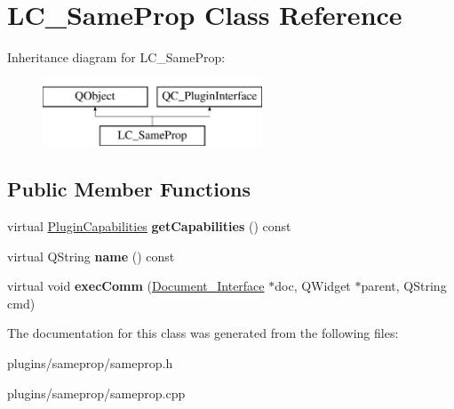 \hypertarget{classLC__SameProp}{\section{L\-C\-\_\-\-Same\-Prop Class Reference}
\label{classLC__SameProp}
}
Inheritance diagram for L\-C\-\_\-\-Same\-Prop\-:\begin{figure}[H]
\begin{center}
\leavevmode
\includegraphics[height=2.000000cm]{classLC__SameProp}
\end{center}
\end{figure}
\subsection*{Public Member Functions}
\begin{DoxyCompactItemize}
\item 
\hypertarget{classLC__SameProp_a3d8a857ecc7551931426791017690f13}{virtual \hyperlink{classPluginCapabilities}{Plugin\-Capabilities} {\bfseries get\-Capabilities} () const }\label{classLC__SameProp_a3d8a857ecc7551931426791017690f13}

\item 
\hypertarget{classLC__SameProp_af27e3f4056960b005410eafc2fc4e384}{virtual Q\-String {\bfseries name} () const }\label{classLC__SameProp_af27e3f4056960b005410eafc2fc4e384}

\item 
\hypertarget{classLC__SameProp_a447c64e7106fbcccd6e8e80cf33c8357}{virtual void {\bfseries exec\-Comm} (\hyperlink{classDocument__Interface}{Document\-\_\-\-Interface} $\ast$doc, Q\-Widget $\ast$parent, Q\-String cmd)}\label{classLC__SameProp_a447c64e7106fbcccd6e8e80cf33c8357}

\end{DoxyCompactItemize}


The documentation for this class was generated from the following files\-:\begin{DoxyCompactItemize}
\item 
plugins/sameprop/sameprop.\-h\item 
plugins/sameprop/sameprop.\-cpp\end{DoxyCompactItemize}
